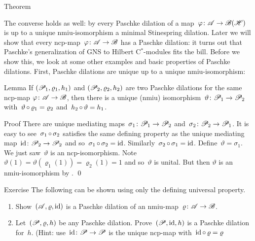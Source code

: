 \begin{parsec}
\begin{point}{Theorem}
\begin{point}%
The converse holds as well:
    by 
    every Paschke dilation of a map~$\varphi \colon \mathscr{A} \to \mathscr{B}(\mathscr{H})$
    is up to a unique nmiu-isomorphism a minimal Stinespring dilation.
Later we will show that
    every ncp-map~$\varphi\colon \mathscr{A} \to \mathscr{B}$
    has a Paschke dilation:
    it turns out that Paschke's generalization of
    GNS to Hilbert C$^*$-modules fits the bill.
Before we show this,
    we look at some other examples and basic properties
        of Paschke dilations.
First, Paschke dilations are unique up to a unique nmiu-isomorphism:
\par
\end{point}
\end{point}
\begin{point}{Lemma}%
If $(\mathscr{P}_1, \varrho_1, h_1)$
and $(\mathscr{P}_2, \varrho_2, h_2)$
    are two Paschke dilations for 
    the same ncp-map $\varphi\colon \mathscr{A} \to \mathscr{B}$,
    then there is a unique (nmiu)
    isomorphism~$\vartheta \colon \mathscr{P}_1 \to \mathscr{P}_2$
    with~$\vartheta \mathop{\circ} \varrho_1 = \varrho_2$
    and~$h_2 \mathop{\circ} \vartheta = h_1$.
\begin{point}{Proof}%
There are unique mediating maps~$\sigma_1\colon \mathscr{P}_1 \to \mathscr{P}_2$
and~$\sigma_2 \colon \mathscr{P}_2 \to \mathscr{P}_1$.
It is easy to see~$\sigma_1 \mathop{\circ} \sigma_2$
satisfies the same defining property
as the unique mediating map~$\operatorname{id}\colon \mathscr{P}_2 \to \mathscr{P}_2$
and so~$\sigma_1 \mathop{\circ} \sigma_2 = \operatorname{id}$.
Similarly~$\sigma_2 \mathop{\circ} \sigma_1 = \operatorname{id}$.
Define~$\vartheta = \sigma_1$.
We just saw~$\vartheta$ is an ncp-isomorphism.
Note~$\vartheta(1) = \vartheta(\varrho_1(1)) = \varrho_2(1) = 1$
and so~$\vartheta$ is unital.
But then
    $\vartheta$ is an nmiu-isomorphism
    by . \qed
\par
\end{point}
\end{point}
\begin{point}{Exercise}%
The following can be shown using only the defining universal property.
\begin{enumerate}
\item
Show~$(\mathscr{A},\varrho,\operatorname{id})$ is a Paschke dilation of
    an nmiu-map~$\varrho\colon \mathscr{A} \to \mathscr{B}$.
\item
Let~$(\mathscr{P}, \varrho, h)$ be any Paschke dilation.
Prove~$(\mathscr{P}, \operatorname{id}, h)$ is a Paschke dilation for~$h$.
(Hint: use~$\operatorname{id}\colon \mathscr{P} \to \mathscr{P}$
is the unique ncp-map with~$\operatorname{id} \mathop{\circ} \varrho = \varrho$

\end{enumerate}
\end{point}
\end{parsec}
